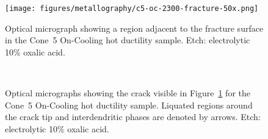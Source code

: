 {%


\begin{figure}
    \centering
    \texttt{[image: figures/metallography/c5-oc-2300-fracture-50x.png]}
    \caption{Optical micrograph showing a region adjacent to the fracture surface in the Cone~5 On-Cooling \protect{} hot ductility sample. Etch: electrolytic 10\% oxalic acid.}
    \label{fig:c5-oc-2300-fracture-50x}
\end{figure}

\begin{figure}
    \centering
     \\
    \caption[Optical micrographs showing the crack visible in Figure~\ref{fig:c5-oc-2300-fracture-50x} for the Cone~5 On-Cooling \protect{} hot ductility sample.]{Optical micrographs showing the crack visible in Figure~\ref{fig:c5-oc-2300-fracture-50x} for the Cone~5 On-Cooling \protect{} hot ductility sample. Liquated regions around the crack tip and interdendritic phases are denoted by arrows. Etch: electrolytic 10\% oxalic acid.}
    \label{fig:c5-oc-2300-crack-olm}
\end{figure}

}

